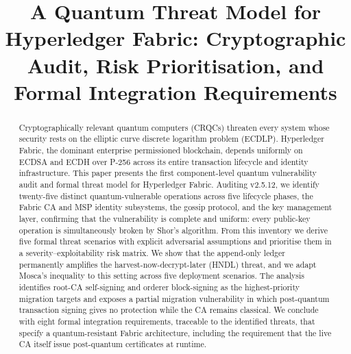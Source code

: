 \documentclass[conference]{IEEEtran}
\begin{document}
\title{A Quantum Threat Model for Hyperledger Fabric: Cryptographic Audit, Risk Prioritisation, and Formal Integration Requirements}

\author{
\and
{}
\and
{}
}

\maketitle

\begin{abstract}
Cryptographically relevant quantum computers (CRQCs) threaten every system whose security rests on the elliptic curve discrete logarithm problem (ECDLP). Hyperledger Fabric, the dominant enterprise permissioned blockchain, depends uniformly on ECDSA and ECDH over P-256 across its entire transaction lifecycle and identity infrastructure. This paper presents the first component-level quantum vulnerability audit and formal threat model for Hyperledger Fabric. Auditing v2.5.12, we identify twenty-five distinct quantum-vulnerable operations across five lifecycle phases, the Fabric CA and MSP identity subsystems, the gossip protocol, and the key management layer, confirming that the vulnerability is complete and uniform: every public-key operation is simultaneously broken by Shor's algorithm. From this inventory we derive five formal threat scenarios with explicit adversarial assumptions and prioritise them in a severity--exploitability risk matrix. We show that the append-only ledger permanently amplifies the harvest-now-decrypt-later (HNDL) threat, and we adapt Mosca's inequality to this setting across five deployment scenarios. The analysis identifies root-CA self-signing and orderer block-signing as the highest-priority migration targets and exposes a partial migration vulnerability in which post-quantum transaction signing gives no protection while the CA remains classical. We conclude with eight formal integration requirements, traceable to the identified threats, that specify a quantum-resistant Fabric architecture, including the requirement that the live CA itself issue post-quantum certificates at runtime.
\end{abstract}
\end{document}
